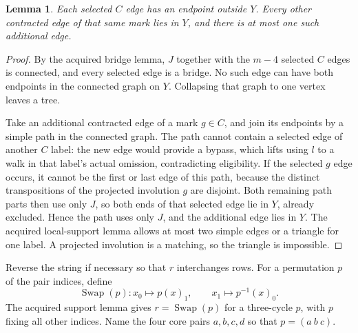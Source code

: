 \documentclass[11pt,a4paper]{article}
\newtheorem{lemma}{Lemma}
\newcommand{\sw}{\operatorname{Swap}}
\begin{document}
\begin{lemma}\label{extras}
Each selected $C$ edge has an endpoint outside $Y$. Every other
contracted edge of that same mark lies in $Y$, and there is at
most one such additional edge.
\end{lemma}
\begin{proof}
By the acquired bridge lemma, $J$ together with the $m-4$
selected $C$ edges is connected, and every selected edge is a
bridge. No such edge can have both endpoints in the connected
graph on $Y$. Collapsing that graph to one vertex leaves a tree.

Take an additional contracted edge of a mark $g\in C$, and
join its endpoints by a simple path in the connected graph.
The path cannot contain a selected edge of another $C$ label:
the new edge would provide a bypass, which lifts using $l$ to
a walk in that label's actual omission, contradicting eligibility.
If the selected $g$ edge occurs, it cannot be the first or last
edge of this path, because the distinct transpositions of the
projected involution $g$ are disjoint. Both remaining path parts
then use only $J$, so both ends of that selected edge lie in
$Y$, already excluded. Hence the path uses only $J$, and the
additional edge lies in $Y$. The acquired local-support lemma
allows at most two simple edges or a triangle for one label.
A projected involution is a matching, so the triangle is impossible.
\end{proof}

Reverse the string if necessary so that $r$ interchanges rows.
For a permutation $p$ of the pair indices, define
\[
 \sw(p):x_0\longmapsto p(x)_1,\qquad
          x_1\longmapsto p^{-1}(x)_0.
\]
The acquired support lemma gives $r=\sw(p)$ for a three-cycle
$p$, with $p$ fixing all other indices. Name the four core pairs
$a,b,c,d$ so that $p=(a\ b\ c)$.
\end{document}
